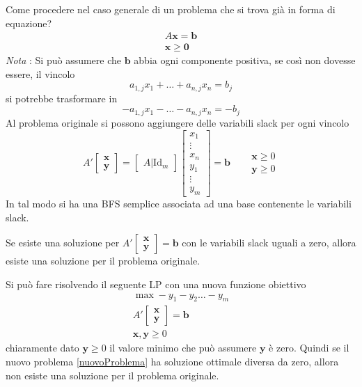 \documentclass[10pt, letterpaper]{report}
\begin{document}
Come procedere nel caso generale di un problema che si trova già in forma di equazione? 
\begin{eqnarray*}
    A\mathbf x = \mathbf b \\ \mathbf x \ge \mathbf 0
\end{eqnarray*}
\textit{Nota} : Si può assumere che $\mathbf b$ abbia ogni componente positiva, se così non dovesse essere, il vincolo 
$$ a_{1,j}x_1+\dots + a_{n,j}x_n=b_j$$
si potrebbe trasformare in 
$$ -a_{1,j}x_1-\dots - a_{n,j}x_n=-b_j$$
Al problema originale si possono aggiungere delle variabili slack per ogni vincolo 
$$ A'\begin{bmatrix}\mathbf x \\ \mathbf y \end{bmatrix}=\begin{bmatrix}
    A | \text{Id}_m
\end{bmatrix}\begin{bmatrix}
    x_1\\ \vdots \\ x_n\\ y_1 \\ \vdots \\ y_m
\end{bmatrix}=\mathbf b \ \ \ \ \ \ \ \  \begin{matrix}
    \mathbf x\ge 0 \\ \mathbf y \ge 0
\end{matrix}$$
In tal modo si ha una BFS semplice associata ad una base contenente le variabili slack. 
\begin{osservazione}
    Se esiste una soluzione per $A'\begin{bmatrix}\mathbf x \\ \mathbf y \end{bmatrix}=\mathbf b$ con le variabili slack uguali a zero, allora esiste una soluzione per il problema originale.
\end{osservazione}
Si può fare risolvendo il seguente LP con una nuova funzione obiettivo \begin{equation}\label{nuovoProblema}
    \begin{matrix}
    \max -y_1-y_2\dots - y_m\\ 
    A'\begin{bmatrix}\mathbf x \\ \mathbf y \end{bmatrix}=\mathbf b\\ 
    \mathbf x,\mathbf y \ge 0 
\end{matrix}\end{equation}
chiaramente dato $\mathbf y \ge 0$ il valore minimo che può assumere $\mathbf y $ è zero. Quindi se il nuovo problema \ref{nuovoProblema} ha soluzione ottimale diversa da zero, allora non esiste una soluzione per il problema originale.
\end{document}
